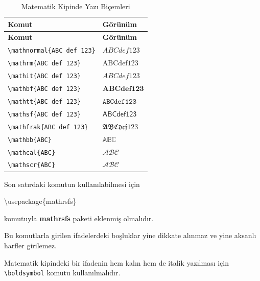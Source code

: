 \documentclass[
  letterpaper,
  DIV=11,
  numbers=noendperiod]{scrreprt}
\newenvironment{Shaded}{\begin{snugshade}}{\end{snugshade}}
\newcommand{\BuiltInTok}[1]{\textcolor[rgb]{0.00,0.23,0.31}{#1}}
\newcommand{\ExtensionTok}[1]{\textcolor[rgb]{0.00,0.23,0.31}{#1}}
\newcommand{\NormalTok}[1]{\textcolor[rgb]{0.00,0.23,0.31}{#1}}
\begin{document}
\hypertarget{tbl-matyazi}{}
\begin{longtable}[]{@{}ll@{}}
\caption{\label{tbl-matyazi}Matematik Kipinde Yazı
Biçemleri}\tabularnewline
\toprule()
\textbf{Komut} & \textbf{Görünüm} \\
\midrule()
\endfirsthead
\toprule()
\textbf{Komut} & \textbf{Görünüm} \\
\midrule()
\endhead
\texttt{\textbackslash{}mathnormal\{ABC\ def\ 123\}} &
\(ABC def 123\) \\
\texttt{\textbackslash{}mathrm\{ABC\ def\ 123\}} &
\(\mathrm{ABC def 123}\) \\
\texttt{\textbackslash{}mathit\{ABC\ def\ 123\}} &
\(\mathit{ABC def 123}\) \\
\texttt{\textbackslash{}mathbf\{ABC\ def\ 123\}} &
\(\mathbf{ABC def 123}\) \\
\texttt{\textbackslash{}mathtt\{ABC\ def\ 123\}} &
\(\mathtt{ABC def 123}\) \\
\texttt{\textbackslash{}mathsf\{ABC\ def\ 123\}} &
\(\mathsf{ABC def 123}\) \\
\texttt{\textbackslash{}mathfrak\{ABC\ def\ 123\}} &
\(\mathfrak{ABC def 123}\) \\
\texttt{\textbackslash{}mathbb\{ABC\}} & \(\mathbb{ABC}\) \\
\texttt{\textbackslash{}mathcal\{ABC\}} & \(\mathcal{ABC}\) \\
\texttt{\textbackslash{}mathscr\{ABC\}} & \(\mathscr{ABC}\) \\
\bottomrule()
\end{longtable}

Son satırdaki komutun kullanılabilmesi için

\begin{Shaded}
\begin{Highlighting}[]
\BuiltInTok{\textbackslash{}usepackage}\NormalTok{\{}\ExtensionTok{mathrsfs}\NormalTok{\}}
\end{Highlighting}
\end{Shaded}

komutuyla \textbf{mathrsfs} paketi eklenmiş olmalıdır.

Bu komutlarla girilen ifadelerdeki boşluklar yine dikkate alınmaz ve
yine aksanlı harfler girilemez.

Matematik kipindeki bir ifadenin hem kalın hem de italik yazılması için
\texttt{\textbackslash{}boldsymbol} komutu kullanılmalıdır.
\end{document}
